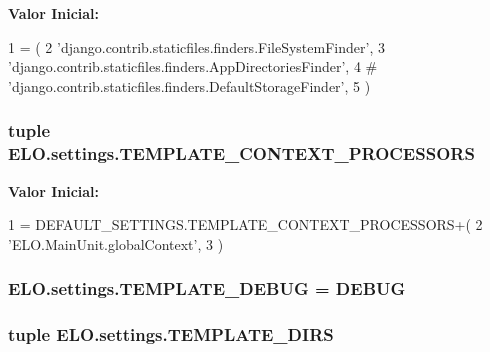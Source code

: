 {\bfseries Valor Inicial\-:}
\begin{DoxyCode}
1 = (
2     \textcolor{stringliteral}{'django.contrib.staticfiles.finders.FileSystemFinder'},
3     \textcolor{stringliteral}{'django.contrib.staticfiles.finders.AppDirectoriesFinder'},
4 \textcolor{comment}{#    'django.contrib.staticfiles.finders.DefaultStorageFinder',}
5 )
\end{DoxyCode}
\hypertarget{namespaceELO_1_1settings_ad62b51880946e9380913c2f3811311bf}{
\subsubsection[{T\-E\-M\-P\-L\-A\-T\-E\-\_\-\-C\-O\-N\-T\-E\-X\-T\-\_\-\-P\-R\-O\-C\-E\-S\-S\-O\-R\-S}]{\setlength{\rightskip}{0pt plus 5cm}tuple E\-L\-O.\-settings.\-T\-E\-M\-P\-L\-A\-T\-E\-\_\-\-C\-O\-N\-T\-E\-X\-T\-\_\-\-P\-R\-O\-C\-E\-S\-S\-O\-R\-S}}\label{df/d5b/namespaceELO_1_1settings_ad62b51880946e9380913c2f3811311bf}
{\bfseries Valor Inicial\-:}
\begin{DoxyCode}
1 = DEFAULT\_SETTINGS.TEMPLATE\_CONTEXT\_PROCESSORS+(
2     \textcolor{stringliteral}{'ELO.MainUnit.globalContext'},
3 )
\end{DoxyCode}
\hypertarget{namespaceELO_1_1settings_a014930e0bf77feccc65c20212593381e}{
\subsubsection[{T\-E\-M\-P\-L\-A\-T\-E\-\_\-\-D\-E\-B\-U\-G}]{\setlength{\rightskip}{0pt plus 5cm}E\-L\-O.\-settings.\-T\-E\-M\-P\-L\-A\-T\-E\-\_\-\-D\-E\-B\-U\-G = {\bf D\-E\-B\-U\-G}}}\label{df/d5b/namespaceELO_1_1settings_a014930e0bf77feccc65c20212593381e}
\hypertarget{namespaceELO_1_1settings_a4e977a41e98923ee4c93b24d22b3d7e2}{
\subsubsection[{T\-E\-M\-P\-L\-A\-T\-E\-\_\-\-D\-I\-R\-S}]{\setlength{\rightskip}{0pt plus 5cm}tuple E\-L\-O.\-settings.\-T\-E\-M\-P\-L\-A\-T\-E\-\_\-\-D\-I\-R\-S}}\label{df/d5b/namespaceELO_1_1settings_a4e977a41e98923ee4c93b24d22b3d7e2}
